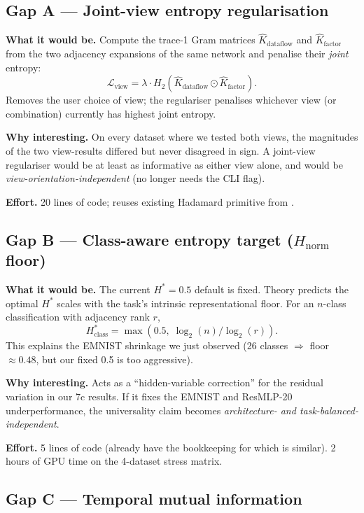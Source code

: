 \documentclass[11pt,a4paper]{article}
\newcommand{\code}[1]{\texttt{\detokenize{#1}}}
\newcommand{\hnorm}{H_{\text{norm}}}
\begin{document}
\subsection{Gap A — Joint-view entropy regularisation}

\textbf{What it would be.} Compute the trace-1 Gram matrices
$\hat K_{\text{dataflow}}$ and $\hat K_{\text{factor}}$ from the
two adjacency expansions of the same network and penalise their
\emph{joint} entropy:
\[
\mathcal{L}_{\text{view}} = \lambda \cdot H_2(\hat K_{\text{dataflow}}
                                              \odot \hat K_{\text{factor}}).
\]
Removes the user choice of view; the regulariser penalises whichever
view (or combination) currently has highest joint entropy.

\textbf{Why interesting.} On every dataset where we tested both views,
the magnitudes of the two view-results differed but never disagreed in
sign. A joint-view regulariser would be at least as informative as
either view alone, and would be \emph{view-orientation-independent}
(no longer needs the \code{--view} CLI flag).

\textbf{Effort.} 20 lines of code; reuses existing Hadamard primitive
from \code{cross_layer_mi}.

\subsection{Gap B — Class-aware entropy target ($\hnorm$ floor)}

\textbf{What it would be.} The current $H^*=0.5$ default is fixed.
Theory predicts the optimal $H^*$ scales with the task's intrinsic
representational floor. For an $n$-class classification with adjacency
rank $r$,
\[
H^*_{\text{class}} = \max\!\left(0.5,\; \log_2(n) / \log_2(r)\right).
\]
This explains the EMNIST shrinkage we just observed (26 classes
$\Rightarrow$ floor $\approx 0.48$, but our fixed 0.5 is too aggressive).

\textbf{Why interesting.} Acts as a ``hidden-variable correction'' for
the residual variation in our 7c results. If it fixes the EMNIST and
ResMLP-20 underperformance, the universality claim becomes
\emph{architecture- and task-balanced-independent}.

\textbf{Effort.} 5 lines of code (already have the bookkeeping for
\code{entropy_target_ka} which is similar). 2 hours of GPU time on the
4-dataset stress matrix.

\subsection{Gap C — Temporal mutual information}
\end{document}
